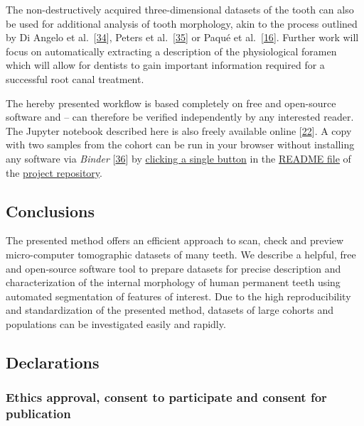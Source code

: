 \documentclass[
  american,
]{article}
\begin{document}
The non-destructively acquired three-dimensional datasets of the tooth can also be used for additional analysis of tooth morphology, akin to the process outlined by Di Angelo et al.~{[}\protect\hyperlink{ref-1Egw08k0d}{34}{]}, Peters et al.~{[}\protect\hyperlink{ref-RxErLYuw}{35}{]} or Paqué et al.~{[}\protect\hyperlink{ref-DLVCfdzK}{16}{]}.
Further work will focus on automatically extracting a description of the physiological foramen which will allow for dentists to gain important information required for a successful root canal treatment.

The hereby presented workflow is based completely on free and open-source software and -- can therefore be verified independently by any interested reader.
The Jupyter notebook described here is also freely available online {[}\protect\hyperlink{ref-tZRGGuMm}{22}{]}.
A copy with two samples from the cohort can be run in your browser without installing any software via \emph{Binder} {[}\protect\hyperlink{ref-Q20Bxdsr}{36}{]} by \href{https://mybinder.org/v2/gh/habi/zmk-tooth-cohort/master?filepath=ToothAnalysis.ipynb}{clicking a single button} in the \href{https://github.com/habi/zmk-tooth-cohort/blob/master/README.md}{README file} of the \href{https://github.com/habi/zmk-tooth-cohort/}{project repository}.

\hypertarget{conclusions}{%
\subsection{Conclusions}\label{conclusions}}

The presented method offers an efficient approach to scan, check and preview micro-computer tomographic datasets of many teeth.
We describe a helpful, free and open-source software tool to prepare datasets for precise description and characterization of the internal morphology of human permanent teeth using automated segmentation of features of interest.
Due to the high reproducibility and standardization of the presented method, datasets of large cohorts and populations can be investigated easily and rapidly.

\hypertarget{declarations}{%
\subsection{Declarations}\label{declarations}}

\hypertarget{ethics-approval-consent-to-participate-and-consent-for-publication}{%
\subsubsection{Ethics approval, consent to participate and consent for publication}\label{ethics-approval-consent-to-participate-and-consent-for-publication}}
\end{document}
